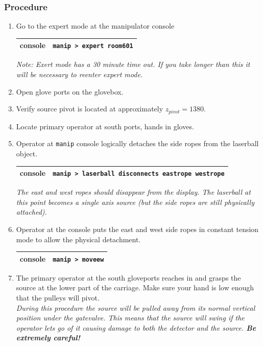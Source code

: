 \subsubsection{Procedure}
\begin{enumerate}
\item \CheckBox[name=dsr1]{} Go to the expert mode at the manipulator console
\begin{center}
\begin{tabular}{|c|c|}
\hline
console & \verb+manip > expert room601+\\
\hline
\end{tabular}
\end{center}
{\it Note: Exert mode has a 30 minute time out. If you take longer than this it will be necessary to reenter expert mode.}
\item \CheckBox[name=dsr2]{} Open glove ports on the glovebox.
\item \CheckBox[name=dsr3]{} Verify source pivot is located at approximately $z_{pivot} = 1380$.
\item \CheckBox[name=dsr4]{} Locate primary operator at south ports, hands in gloves.
\item \CheckBox[name=dsr5]{} Operator at \verb+manip+ console logically detaches the side ropes from the laserball object.
\begin{center}
\begin{tabular}{|c|c|}
\hline
console & \verb+manip > laserball disconnects eastrope westrope+ \\
\hline
\end{tabular}
\end{center}
{\it The east and west ropes should disappear from the display. The laserball at this point becomes a single axis source (but the side ropes are still physically attached).}
\item \CheckBox[name=dsr6]{} Operator at the console puts the east and west side ropes in constant tension mode to allow the physical detachment.
\begin{center}
\begin{tabular}{|c|c|}
\hline
console & \verb+manip > moveew+\\
\hline
\end{tabular}
\end{center}
\item \CheckBox[name=dsr7]{} The primary operator at the south gloveports reaches in and grasps the source at the lower part of the carriage. Make sure your hand is low enough that the pulleys will pivot. \\ {\it During this procedure the source will be pulled away from its normal vertical position under the gatevalve. This means that the source will swing if the operator lets go of it causing damage to both the detector and the source. {\bf Be extremely careful!}}

\end{enumerate}
